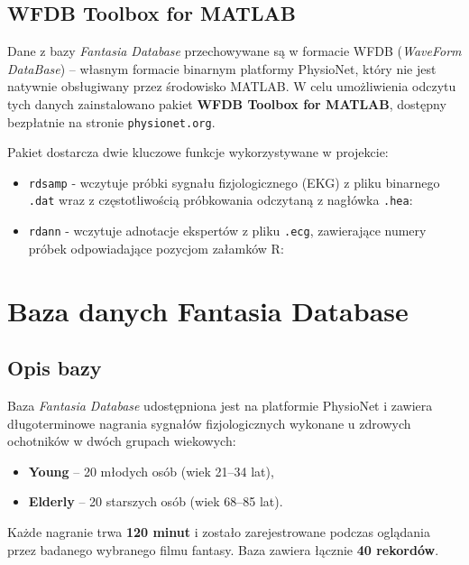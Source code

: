 \documentclass[a4paper,12pt]{article}
\begin{document}
\subsection{WFDB Toolbox for MATLAB}

Dane z bazy \textit{Fantasia Database} przechowywane są w formacie WFDB (\textit{WaveForm DataBase}) -- własnym formacie binarnym platformy PhysioNet, który nie jest natywnie obsługiwany przez środowisko MATLAB. W celu umożliwienia odczytu tych danych zainstalowano pakiet \textbf{WFDB Toolbox for MATLAB}, dostępny bezpłatnie na stronie \texttt{physionet.org}.

Pakiet dostarcza dwie kluczowe funkcje wykorzystywane w projekcie:

\begin{itemize}
    \item \texttt{rdsamp} - wczytuje próbki sygnału fizjologicznego (EKG) z pliku binarnego \texttt{.dat} wraz z częstotliwością próbkowania odczytaną z nagłówka \texttt{.hea}:

    \item \texttt{rdann} - wczytuje adnotacje ekspertów z pliku \texttt{.ecg}, zawierające numery próbek odpowiadające pozycjom załamków R:

\end{itemize}


\section{Baza danych Fantasia Database}

\subsection{Opis bazy}

Baza \textit{Fantasia Database} udostępniona jest na platformie PhysioNet i zawiera długoterminowe nagrania sygnałów fizjologicznych wykonane u zdrowych ochotników w dwóch grupach wiekowych:

\begin{itemize}
    \item \textbf{Young} -- 20 młodych osób (wiek 21--34 lat),
    \item \textbf{Elderly} -- 20 starszych osób (wiek 68--85 lat).
\end{itemize}

Każde nagranie trwa \textbf{120 minut} i zostało zarejestrowane podczas oglądania przez badanego wybranego filmu fantasy. Baza zawiera łącznie \textbf{40 rekordów}.
\end{document}
